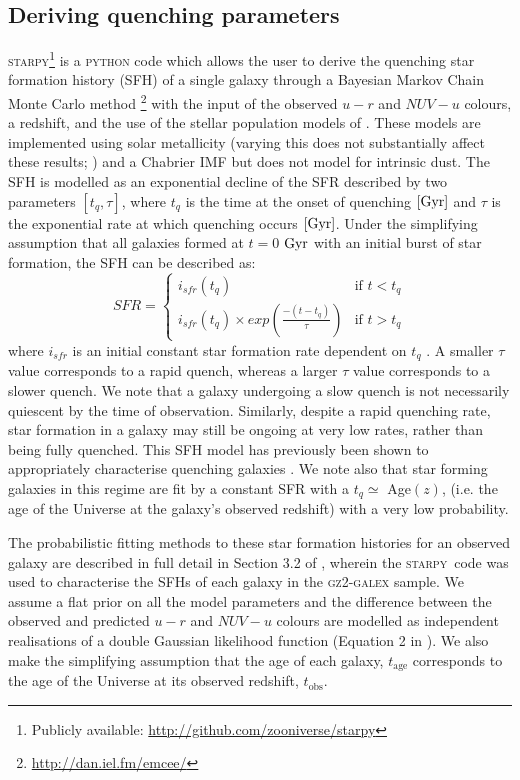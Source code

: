 \documentclass[useAMS,usenatbib]{mn2e}
\def\starpy ~{\textsc{starpy}}
\begin{document}
\subsection{Deriving quenching parameters}\label{sec:starpy}

\textsc{starpy}\footnote{Publicly available: \url{http://github.com/zooniverse/starpy}} is a \textsc{python} code which allows the user to derive the quenching star formation history (SFH) of a single galaxy through a Bayesian Markov Chain Monte Carlo method \citep{emcee13}\footnote{\url{http://dan.iel.fm/emcee/}} with the input of the observed $u-r$ and $NUV-u$ colours, a redshift, and the use of the stellar population models of \cite{BC03}.  These models are implemented using solar metallicity (varying this does not substantially affect these results; \citealt{smethurst15}) and a Chabrier IMF \citep{chabrier03} but does not model for intrinsic dust. The SFH is modelled as an exponential decline of the SFR described by two parameters $[t_{q}, \tau]$, where $t_{q}$ is the time at the onset of quenching $\rm{[Gyr]}$ and $\tau$ is the exponential rate at which quenching occurs $\rm{[Gyr]}$. Under the simplifying assumption that all galaxies formed at $t=0$ $\rm{ Gyr}$ with an initial burst of star formation, the SFH can be described as: 
\begin{equation}\label{sfh}
SFR =
\begin{cases}
i_{sfr}(t_{q}) & \text{if } t < t_{q} \\
i_{sfr}(t_{q}) \times exp{\left( \frac{-(t-t_{q})}{\tau}\right)} & \text{if } t > t_{q} 
\end{cases}
\end{equation}
where $i_{sfr}$ is an initial constant star formation rate dependent on $t_{q}$ \citep{schawinski14, smethurst15}.  A smaller $\tau$ value corresponds to a rapid quench, whereas a larger $\tau$ value corresponds to a slower quench. We note that a galaxy undergoing a slow quench is not necessarily quiescent by the time of observation. Similarly, despite a rapid quenching rate, star formation in a galaxy may still be ongoing at very low rates, rather than being fully quenched. This SFH model has previously been shown to appropriately characterise quenching galaxies \citep{Weiner06, Martin07, Noeske07,schawinski14}. We note also that star forming galaxies in this regime are fit by a constant SFR with a $t_{q} \simeq$ Age$(z)$, (i.e. the age of the Universe at the galaxy's observed redshift) with a very low probability.

The probabilistic fitting methods to these star formation histories for an observed galaxy are described in full detail in Section 3.2 of \cite{smethurst15}, wherein the \starpy ~~code was used to characterise the SFHs of each galaxy in the \textsc{gz2-galex} sample. We assume a flat prior on all the model parameters and the difference between the observed and predicted $u-r$ and $NUV-u$ colours are modelled as independent realisations of a double Gaussian likelihood function (Equation 2 in \citealt{smethurst15}). We also make the simplifying assumption that the age of each galaxy, $t_\mathrm{age}$ corresponds to the age of the Universe at its observed redshift, $t_\mathrm{obs}$.
\end{document}
